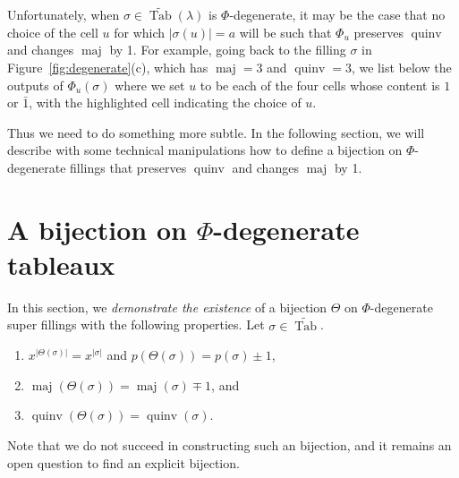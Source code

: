\documentclass[11pt]{article}
\theoremstyle{definition}
\numberwithin{equation}{section}
\DeclareMathOperator{\PQT}{Tab}
\DeclareMathOperator{\maj}{maj}
\DeclareMathOperator{\quinv}{quinv}
\newcommand\cell[3]{
\def\i{#1} \def\j{#2} \def\entry{#3}

\draw (\j-1,-\i)--(\j,-\i)--(\j,-\i+1)--(\j-1,-\i+1)--(\j-1,-\i);
\node at (\j-.5,-\i+.5) {\entry};
}
\newcommand\graycell[3]{
\def\i{#1} \def\j{#2} \def\entry{#3}
\draw[fill=gray!60](\j-1,-\i)--(\j,-\i)--(\j,-\i+1)--(\j-1,-\i+1)--(\j-1,-\i);
\node at (\j-.5,-\i+.5) {\entry};
}
\begin{document}
Unfortunately, when $\sigma\in\widetilde{\PQT}(\lambda)$ is $\Phi$-degenerate, it may be the case that no choice of the cell $u$ for which $|\sigma(u)|=a$ will be such that $\Phi_u$ preserves $\quinv$ and changes $\maj$ by 1. For example, going back to the filling $\sigma$ in Figure~\ref{fig:degenerate}(c), which has $\maj=3$ and $\quinv=3$, we list below the outputs of $\Phi_u(\sigma)$ where we set $u$ to be each of the four cells whose content is $1$ or $\bar{1}$, with the highlighted cell indicating the choice of $u$.

\begin{center}
\quad
{}
\quad
{}
\quad
{}
\end{center}


Thus we need to do something more subtle. In the following section, we will describe with some technical manipulations how to define a bijection on $\Phi$-degenerate fillings that preserves $\quinv$ and changes $\maj$ by 1. 


\section{A bijection on $\Phi$-degenerate tableaux}
\label{sec:Phi-degenerate}

In this section, we \emph{demonstrate the existence} of a bijection $\Theta$ on $\Phi$-degenerate super fillings with the following properties. Let $\sigma\in\widetilde{\PQT}$. 
\begin{enumerate}[label=\roman*.]
\item $x^{|\Theta(\sigma)|}=x^{|\sigma|}$ and $p(\Theta(\sigma))=p(\sigma)  \pm 1$,
\item $\maj(\Theta(\sigma))=\maj(\sigma)\mp 1$, and
\item $\quinv(\Theta(\sigma))=\quinv(\sigma)$.
\end{enumerate}
Note that we do not succeed in constructing such an bijection, and it remains an open question to find an explicit bijection.
\end{document}
